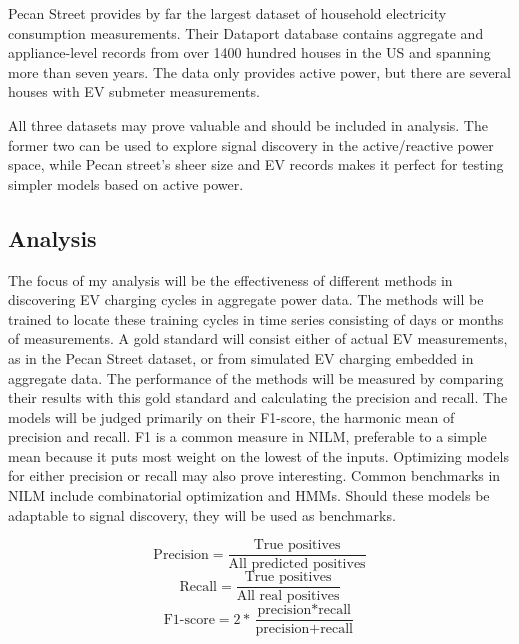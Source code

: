\documentclass[12pt, american]{article}
\begin{document}
Pecan Street provides by far the largest dataset of household electricity consumption measurements. Their Dataport database contains aggregate and appliance-level records from over 1400 hundred houses in the US and spanning more than seven years\cite{Pecan2018}. The data only provides active power, but there are several houses with EV submeter measurements.

All three datasets may prove valuable and should be included in analysis. The former two can be used to explore signal discovery in the active/reactive power space, while Pecan street's sheer size and EV records makes it perfect for testing simpler models based on active power.

\subsection{Analysis}
The focus of my analysis will be the effectiveness of different methods in discovering EV charging cycles in aggregate power data. The methods will be trained to locate these training cycles in time series consisting of days or months of measurements. A gold standard will consist either of actual EV measurements, as in the Pecan Street dataset, or from simulated EV charging embedded in aggregate data. The performance of the methods will be measured by comparing their results with this gold standard and calculating the precision and recall. The models will be judged primarily on their F1-score, the harmonic mean of precision and recall. F1 is a common measure in NILM, preferable to a simple mean because it puts most weight on the lowest of the inputs. Optimizing models for either precision or recall may also prove interesting. Common benchmarks in NILM include combinatorial optimization and HMMs. Should these models be adaptable to signal discovery, they will be used as benchmarks.

\begin{equation}
\label{eq:precision}
\text{Precision} = \frac{\text{True positives}}{\text{All predicted positives}}
\end{equation}
\begin{equation}
\label{eq:recall}
\text{Recall} = \frac{\text{True positives}}{\text{All real positives}}
\end{equation}
\begin{equation}
\label{eq:F1}
\text{F1-score} = 2*\frac{\text{precision}*\text{recall}}{\text{precision}+\text{recall}}
\end{equation}
\end{document}
